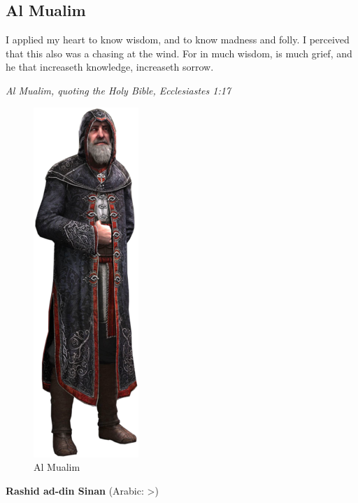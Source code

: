 \subsection{Al Mualim}
\label{subsec:al_mualim}


\begin{tcolorbox}[breakable, colback=gray!5, colframe=gray, title=] %
I applied my heart to know wisdom, and to know madness and folly. 
I perceived that this also was a chasing at the wind. 
For in much wisdom, is much grief, and he that increaseth knowledge, increaseth sorrow.

\hfill \textit{Al Mualim, quoting the Holy Bible, Ecclesiastes 1:17}
\end{tcolorbox}

\begin{figure}[hbt]
\centering
	\includegraphics[width=0.3\linewidth]{images/al_mualim}
	\caption{Al Mualim}
	\label{fig:al_mualim}
\end{figure}

\textbf{Rashid ad-din Sinan} (Arabic: \<>)